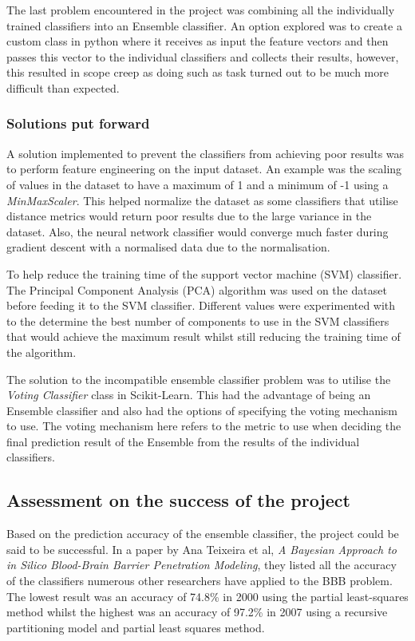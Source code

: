 \documentclass[a4paper,12pt]{article}
\begin{document}
	The last problem encountered in the project was combining all the individually trained classifiers into an Ensemble classifier. An option explored was to create a custom class in python where it receives as input the feature vectors and then passes this vector to the individual classifiers and collects their results, however, this resulted in scope creep as doing such as task turned out to be much more difficult than expected. 
	
		\subsubsection{Solutions put forward}
		A solution implemented to prevent the classifiers from achieving poor results was to perform feature engineering on the input dataset. An example was the scaling of values in the dataset to have a maximum of 1 and a minimum of -1 using a \textit{MinMaxScaler}. This helped normalize the dataset as some classifiers that utilise distance metrics would return poor results due to the large variance in the dataset. Also, the neural network classifier would converge much faster during gradient descent with a normalised data due to the normalisation.
		
		To help reduce the training time of the support vector machine (SVM) classifier. The Principal Component Analysis (PCA) algorithm was used on the dataset before feeding it to the SVM classifier. Different values were experimented with to the determine the best number of components to use in the SVM classifiers that would achieve the maximum result whilst still reducing the training time of the algorithm.
		
		The solution to the incompatible ensemble classifier problem was to utilise the \textit{Voting Classifier} class in Scikit-Learn. This had the advantage of being an Ensemble classifier and also had the options of specifying the voting mechanism to use. The voting mechanism here refers to the metric to use when deciding the final prediction result of the Ensemble from the results of the individual classifiers.
		
	\subsection{Assessment on the success of the project}
		Based on the prediction accuracy of the ensemble classifier, the project could be said to be successful. In a paper by Ana Teixeira et al, \textit{A Bayesian Approach to in Silico Blood-Brain Barrier Penetration Modeling}, they listed all the accuracy of the classifiers numerous other researchers have applied to the BBB problem. The lowest result was an accuracy of 74.8\% in 2000 using the partial least-squares method whilst the highest was an accuracy of 97.2\% in 2007 using a recursive partitioning model and partial least squares method. 
		
\end{document}
